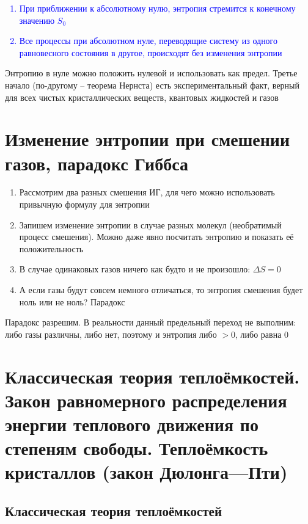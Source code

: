 \documentclass[a4paper, 14pt]{article}
\begin{document}
    \textcolor{blue}{
        \begin{enumerate}
            \item При приближении к абсолютному нулю, энтропия стремится к конечному значению $S_0$
            \item Все процессы при абсолютном нуле, переводящие систему из одного равновесного состояния
            в другое, происходят без изменения энтропии
        \end{enumerate}}

    Энтропию в нуле можно положить нулевой и использовать как предел.
    Третье начало (по-другому -- теорема Нернста) есть экспериментальный факт, верный для всех чистых кристаллических
    веществ, квантовых жидкостей и газов


    \section{Изменение энтропии при смешении газов, парадокс Гиббса}

    \begin{enumerate}
        \item Рассмотрим два разных смешения ИГ, для чего можно использовать привычную формулу для энтропии
        \item Запишем изменение энтропии в случае разных молекул (необратимый процесс смешения).
        Можно даже явно посчитать энтропию и показать её положительность
        \item В случае одинаковых газов ничего как будто и не произошло: $\Delta S = 0$
        \item А если газы будут совсем немного отличаться, то энтропия смешения будет ноль или не ноль?
        Парадокс
    \end{enumerate}

    Парадокс разрешим.
    В реальности данный предельный переход не выполним: либо газы различны, либо нет, поэтому и энтропия либо $>0$,
    либо равна $0$

    \section{Классическая теория теплоёмкостей.
    Закон равномерного распределения энергии теплового движения по степеням свободы.
    Теплоёмкость кристаллов (закон Дюлонга—Пти)}

    \subsection{Классическая теория теплоёмкостей}
\end{document}
